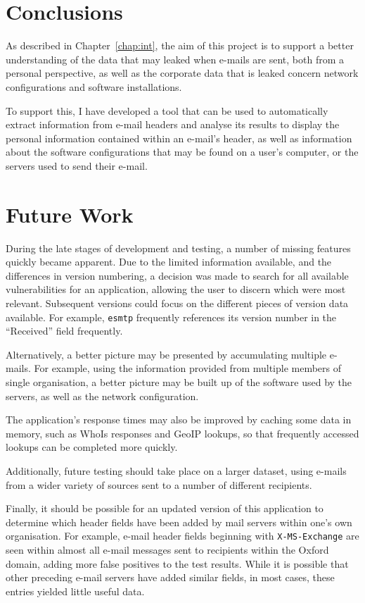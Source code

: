 \section{Conclusions}

As described in Chapter~\ref{chap:int}, the aim of this project is to support a
better understanding of the data that may leaked when e-mails are sent, both
from a personal perspective, as well as the corporate data that is leaked
concern network configurations and software installations.

To support this, I have developed a tool that can be used to automatically
extract information from e-mail headers and analyse its results to display the
personal information contained within an e-mail's header, as well as
information about the software configurations that may be found on a user's
computer, or the servers used to send their e-mail.


\section{Future Work}

During the late stages of development and testing, a number of missing features
quickly became apparent. Due to the limited information available, and the
differences in version numbering, a decision was made to search for all
available vulnerabilities for an application, allowing the user to discern
which were most relevant.  Subsequent versions could focus on the different
pieces of version data available.  For example, \texttt{esmtp} frequently
references its version number in the ``Received'' field frequently.

Alternatively, a better picture may be presented by accumulating multiple
e-mails. For example, using the information provided from multiple members of
single organisation, a better picture may be built up of the software used by
the servers, as well as the network configuration.

The application's response times may also be improved by caching some data in
memory, such as WhoIs responses and GeoIP lookups, so that frequently accessed
lookups can be completed more quickly.

Additionally, future testing should take place on a larger dataset, using
e-mails from a wider variety of sources sent to a number of different
recipients.  

Finally, it should be possible for an updated version of this application to
determine which header fields have been added by mail servers within one's own
organisation.  For example, e-mail header fields beginning with
\texttt{X-MS-Exchange} are seen within almost all e-mail messages sent to
recipients within the Oxford domain, adding more false positives to the test
results. While it is possible that other preceding e-mail servers have added
similar fields, in most cases, these entries yielded little useful data.

